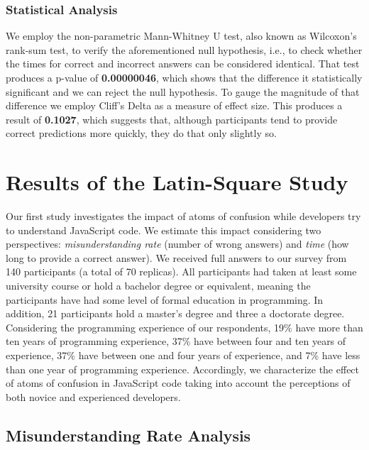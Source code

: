 \subsubsection*{Statistical Analysis}

We employ the non-parametric Mann-Whitney U test, also known as Wilcoxon's rank-sum test, to verify the aforementioned null hypothesis, i.e., to check whether the times for correct and incorrect answers can be considered identical. That test produces a p-value of \textbf{0.00000046}, which shows that the difference it statistically significant and we can reject the null hypothesis. To gauge the magnitude of that difference we employ Cliff's Delta as a measure of effect size. This produces a result of \textbf{0.1027}, which suggests that, although participants tend to provide correct predictions more quickly, they do that only slightly so. 

\section{Results of the Latin-Square Study}\label{sec:latin}

Our first study investigates the impact of atoms of confusion while developers try to understand JavaScript code.
We estimate this impact considering two perspectives: \emph{misunderstanding rate} (number of wrong answers)
and \emph{time} (how long to provide a correct answer).
We received full answers to our survey from 140 participants (a total of 70 replicas). All participants had taken at least some university course or hold a bachelor degree or equivalent, meaning the participants have had some level of formal education in programming. In addition, 21 participants hold a master's degree and three a doctorate degree. 
Considering the programming experience of our respondents, 19\% have more than ten years of programming experience, 37\% have between four and ten years of experience, 37\% have between one and four years of experience, and 7\% have less than one year of programming experience.  
Accordingly, we characterize the effect of atoms of confusion in JavaScript code taking into account the perceptions of both novice and experienced developers. 

\subsection{Misunderstanding Rate Analysis}

